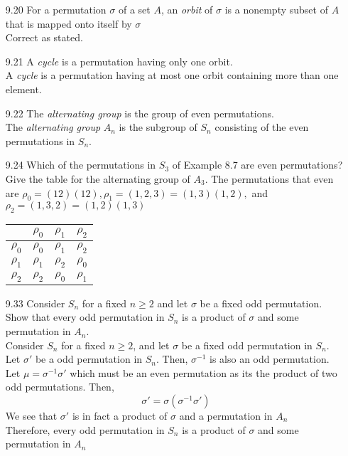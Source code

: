 \documentclass[12pt]{article}
\begin{document}
\begin{enumerate}
	\item[9.20] For a permutation $ \sigma $ of a set $ A $, an \textit{orbit} of $ \sigma $ is a nonempty subset of $ A $ that is mapped onto itself by $ \sigma $\\
	Correct as stated.
	\item[9.21] A \textit{cycle} is a permutation having only one orbit.\\
	A \textit{cycle} is a permutation having at most one orbit containing more than one element.
	\item[9.22] The \textit{alternating group} is the group of even permutations.\\
	The \textit{alternating group} $ A_n $ is the subgroup of $ S_n  $ consisting of the even permutations in $ S_n $.
	\item[9.24] Which of the permutations in $ S_3 $ of Example 8.7 are even permutations? Give the table for the alternating group of $ A_3 $.
	The permutations that even are $ \rho_0=(12)(12),\rho_1=(1,2,3)=(1,3)(1,2), $ and $ \rho_2 = (1,3,2)=(1,2)(1,3) $
	\item[]
	\begin{table}[H]
		\begin{tabular}{|l|l|l|l|}
			\hline
			& \textbf{$\rho_0$} & \textbf{$\rho_1$} & \textbf{$\rho_2$} \\ \hline
			\textbf{$\rho_0$} &$ \rho_0$ & $\rho_1$ & $\rho_2 $\\ \hline
			\textbf{$\rho_1$} &$ \rho_1$ & $\rho_2$ & $\rho_0 $\\ \hline
			\textbf{$\rho_2$} & $\rho_2 $& $\rho_0$ & $\rho_1 $\\ \hline
		\end{tabular}
	\end{table}
	\item[9.33] Consider $ S_n $ for a fixed $ n\geq2 $ and let $ \sigma $ be a fixed odd permutation. Show that every odd permutation in $ S_n $ is a product of $ \sigma $ and some permutation in $ A_n $.\\
	 Consider $ S_n $ for a fixed $ n \geq 2 $, and let $ \sigma $ be a fixed odd permutation in $ S_n $. Let $ \sigma' $ be a odd permutation in $ S_n $. Then, $ \sigma^{-1} $ is also an odd permutation. Let $ \mu = \sigma^{-1}\sigma'$ which must be an even permutation as its the product of two odd permutations. Then, 
	 	\[\sigma' = \sigma(\sigma^{-1}\sigma') \]
	 We see that $ \sigma' $ is in fact a product of $ \sigma $ and a permutation in $ A_n $\\
	 Therefore, every odd permutation in $ S_n $ is a product of $ \sigma $ and some permutation in $ A_n $
	 

\end{enumerate}
\end{document}
